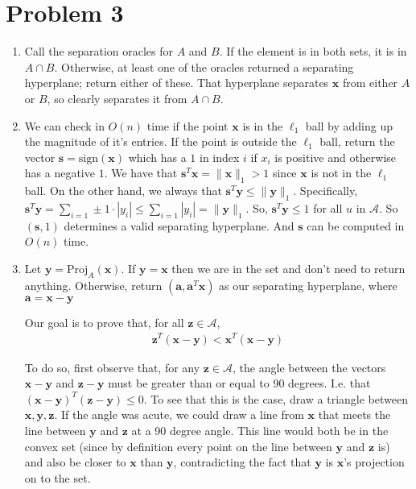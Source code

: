 \documentclass[11pt]{article}
\newcommand{\bv}[1]{\mathbf{#1}}
\begin{document}
	\section*{Problem 3}
	\begin{enumerate}[label=(\alph*)]
		\item
		Call the separation oracles for $A$ and $B$.  If the element is in both sets, it is in $A \cap B$.  Otherwise, at least one of the oracles returned a separating hyperplane; return either of these. That hyperplane separates $\bv{x}$ from either $A$ or $B$, so clearly separates it from $A \cap B$. 
		
		\item
		We can check in $O(n)$ time if the point $\bv{x}$ is in the $\ell_1$ ball by adding up the magnitude of it's entries. If the point is outside the $\ell_1$ ball, return the vector $\bv{s} = \text{sign}(\bv{x})$ which has a $1$ in index $i$ if $x_i$ is positive and otherwise has a negative $1$. We have that $\bv{s}^T\bv{x} = \|\bv{x}\|_1 > 1$ since $\bv{x}$ is not in the $\ell_1$ ball. On the other hand, we always that $\bv{s}^T\bv{y} \leq \|\bv{y}\|_1$. Specifically, $\bv{s}^T\bv{y} = \sum_{i=1} \pm 1 \cdot |y_i| \leq \sum_{i=1} |y_i| = \|\bv{y}\|_1$. So, $\bv{s}^T\bv{y} \leq 1$ for all $u$ in $\mathcal{A}$. So $(\bv{s}, 1)$ determines a valid separating hyperplane. And $\bv{s}$ can be computed in $O(n)$ time.
		
		\item Let $\bv{y} = \text{Proj}_A(\bv{x})$. If $\bv{y} = \bv{x}$ then we are in the set and don't need to return anything. Otherwise, return $(\bv{a}, \bv{a}^T \bv{x})$ as our separating hyperplane, where $\bv{a} = \bv{x} - \bv{y}$
		
		Our goal is to prove that, for all $\bv{z}\in \mathcal{A}$, 
		\begin{align*}
			\bv{z}^T(\bv{x}-\bv{y}) < \bv{x}^T(\bv{x}-\bv{y})
		\end{align*}
		
		To do so, first observe that, for any $\bv{z}\in \mathcal{A}$, the angle between the vectors $\bv{x} - \bv{y}$ and $\bv{z} - \bv{y}$ must be greater than or equal to 90 degrees. I.e. that $(\bv{x} - \bv{y})^T(\bv{z} - \bv{y}) \leq 0$. To see that this is the case, draw a triangle between $\bv{x}, \bv{y}, \bv{z}$. If the angle was acute, we could draw a line from $\bv{x}$ that meets the line between $\bv{y}$ and $\bv{z}$ at a 90 degree angle. This line would both be in the convex set (since by definition every point on the line between $\bv{y}$ and $\bv{z}$ is) and also be closer to $\bv{x}$ than $\bv{y}$, contradicting the fact that $\bv{y}$ is $\bv{x}$'s projection on to the set. 


\end{enumerate}
\end{document}
